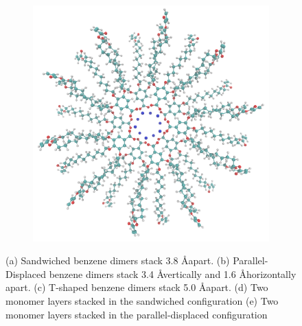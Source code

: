 \documentclass{article}
\newcommand{\angstrom}{\textup{\AA}}
\begin{document}
\begin{figure}[H]
\begin{subfigure}[b]{0.475\textwidth}
		\caption{}\label{fig:sandwichedlayers}
	\end{subfigure}
	\begin{subfigure}[b]{0.475\textwidth}
		\centering
		\includegraphics[width=\textwidth]{offsetlayers.png}
		\caption{}\label{fig:offsetlayers}
	\end{subfigure}
	\caption{(a) Sandwiched benzene dimers stack 3.8 \angstrom apart. (b) Parallel-Displaced benzene dimers stack
	3.4 \angstrom vertically and 1.6 \angstrom horizontally apart. (c) T-shaped benzene dimers stack 5.0 \angstrom apart. 
	(d) Two monomer layers stacked in the sandwiched configuration (e) Two monomer layers stacked in the parallel-displaced
	configuration }\label{fig:stacking}
  \end{figure}
  
\end{document}
